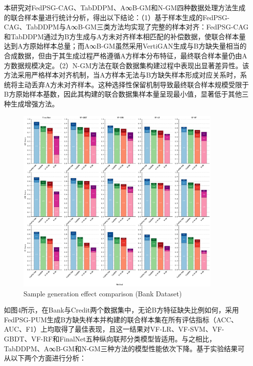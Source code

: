 本研究对FedPSG-CAG、TabDDPM、A∞B-GM和N-GM四种数据处理方法生成的联合样本量进行统计分析，得出以下结论：（1）基于样本生成的FedPSG-CAG、TabDDPM与A∞B-GM三类方法均实现了完整的样本对齐：FedPSG-CAG和TabDDPM通过为B方生成与A方未对齐样本相匹配的补偿数据，使联合样本量达到A方原始样本总量；而A∞B-GM虽然采用VertiGAN生成与B方缺失量相当的合成数据，但由于其生成过程严格遵循A方样本分布特征，最终联合样本量仍由A方数据规模决定。（2）N-GM方法在联合数据集构建过程中表现出显著差异性。该方法采用严格样本对齐机制，当A方样本无法与B方缺失样本形成对应关系时，系统将主动丢弃A方未对齐样本。这种选择性保留机制导致最终联合样本规模受限于B方原始样本基数，因此其构建的联合数据集样本量呈现最小值，显著低于其他三种生成增强方法。
\vspace{-0.1cm}
\begin{figure}[H]
	\centering
	\includegraphics[width=0.9\textwidth]{chapters/imgs/Chapter4Exp3Bank}
	{\wuhao Sample generation effect comparison (Bank Dataset)}
	\label{Chapter4Exp3Bank}
\end{figure}
\vspace{-0.5cm}

如图4所示，在Bank与Credit两个数据集中，无论B方特征缺失比例如何，采用FedPSG-PUM生成B方缺失样本并构建的联合样本集在所有评估指标（ACC、AUC、F1）上均取得了最佳表现，且这一结果对VF-LR、VF-SVM、VF-GBDT、VF-RF和FinalNet五种纵向联邦分类模型皆适用。与之相比，TabDDPM、A∞B-GM和N-GM三种方法的模型性能依次下降。基于实验结果可从以下两个方面进行分析：  

